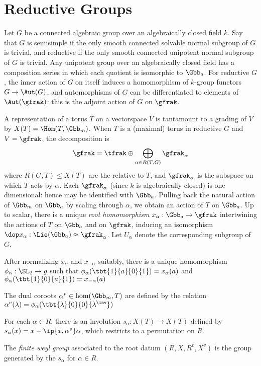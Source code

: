 \documentclass{amsart}
\begin{document}
\section{Reductive Groups}
Let $G$ be a connected algebraic group over an algebraically closed field $k$.  Say that $G$ is semisimple if the only smooth connected solvable normal subgroup of $G$ is trivial, and reductive if the only smooth connected unipotent normal subgroup of $G$ is trivial. Any unipotent group over an algebraically closed field has a composition series in which each quotient is isomorphic to $\Gbb_a$. For reductive $G$, the inner action of $G$ on itself induces a homomorphism of $k$-group functors $G \to \Aut(G)$, and automorphisms of $G$ can be differentiated to elements of $\Aut(\gfrak)$: this is the adjoint action of $G$ on $\gfrak$.

A representation of a torus $T$ on a vectorspace $V$ is tantamount to a grading of $V$ by $X(T) = \Hom(T,\Gbb_m)$. When $T$ is a (maximal) torus  in reductive $G$ and $V = \gfrak$, the decomposition is
\begin{align*}
  \gfrak = \tfrak \oplus \bigoplus_{\alpha \in R(T,G)} \gfrak_\alpha
\end{align*}
where $R(G,T) \leq X(T)$ are the relative to $T$, and $\gfrak_\alpha$ is the subspace on which $T$ acts by $\alpha$. Each $\gfrak_\alpha$ (since $k$ is algebraically closed) is one dimensional: hence may be identified with $\Gbb_a$. Pulling back the natural action of $\Gbb_m$ on $\Gbb_a$ by scaling through $\alpha$, we obtain an action of $T$ on $\Gbb_a$. Up to scalar, there is a unique \emph{root homomorphism} $x_\alpha : \Gbb_a \to \gfrak$ intertwining the actions of $T$ on $\Gbb_a$ and on $\gfrak$, inducing an isomorphism $\dop x_\alpha : \Lie(\Gbb_a) \approx \gfrak_\alpha$. Let $U_\alpha$ denote the corresponding subgroup of $G$.

After normalizing $x_\alpha$ and $x_{-\alpha}$ suitably, there is a unique homomorphism $\phi_\alpha:\SL_2 \to g$ such that $\phi_\alpha(\tbt{1}{a}{0}{1}) = x_\alpha(a)$ and $\phi_{\alpha} (\tbt{1}{0}{a}{1}) = x_{-\alpha}(a)$

The dual coroots $\alpha^v \in \hom(\Gbb_m,T)$ are defined by the relation $\alpha^v(\lambda) = \phi_\alpha(\tbt{\lambda}{0}{0}{\lambda^\inv})$

For each $\alpha \in R$, there is an involution $s_\alpha : X(T) \to X(T)$ defined by $s_\alpha (x) = x - \ip{x, \alpha^v}\alpha$, which restricts to a permutation on $R$.

The \emph{finite weyl group} associated to the root datum $(R,X,R^v,X^v)$ is the group generated by the $s_\alpha$ for $\alpha \in R$.
\end{document}

